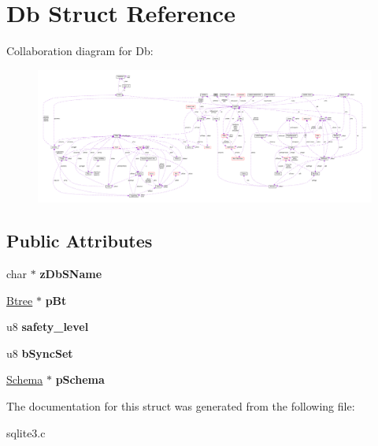 \hypertarget{structDb}{}\section{Db Struct Reference}
\label{structDb}


Collaboration diagram for Db\+:\nopagebreak
\begin{figure}[H]
\begin{center}
\leavevmode
\includegraphics[width=350pt]{structDb__coll__graph}
\end{center}
\end{figure}
\subsection*{Public Attributes}
\begin{DoxyCompactItemize}
\item 
char $\ast$ {\bfseries z\+Db\+S\+Name}\hypertarget{structDb_a3129038e85466e764d1c866af0c9b3a2}{}\label{structDb_a3129038e85466e764d1c866af0c9b3a2}

\item 
\hyperlink{structBtree}{Btree} $\ast$ {\bfseries p\+Bt}\hypertarget{structDb_a0633e5a6abfc39246d07cc6a417a5852}{}\label{structDb_a0633e5a6abfc39246d07cc6a417a5852}

\item 
u8 {\bfseries safety\+\_\+level}\hypertarget{structDb_a04597a5c023d8b328193450b177ff24c}{}\label{structDb_a04597a5c023d8b328193450b177ff24c}

\item 
u8 {\bfseries b\+Sync\+Set}\hypertarget{structDb_a37f3a8593c9d7042c1c26dd492c409e4}{}\label{structDb_a37f3a8593c9d7042c1c26dd492c409e4}

\item 
\hyperlink{structSchema}{Schema} $\ast$ {\bfseries p\+Schema}\hypertarget{structDb_afd8647a83a4a7053231b92814520d6d4}{}\label{structDb_afd8647a83a4a7053231b92814520d6d4}

\end{DoxyCompactItemize}


The documentation for this struct was generated from the following file\+:\begin{DoxyCompactItemize}
\item 
sqlite3.\+c\end{DoxyCompactItemize}
